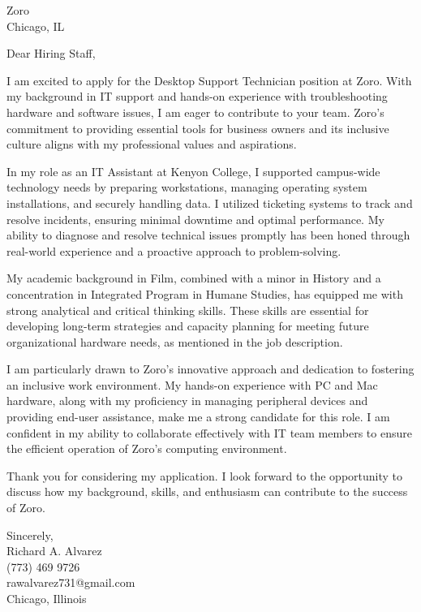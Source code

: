 \documentclass[a4paper,10pt]{letter}
\begin{document}
\begin{letter}{Zoro \\
Chicago, IL}

\opening{Dear Hiring Staff,}

I am excited to apply for the Desktop Support Technician position at Zoro. With my background in IT support and hands-on experience with troubleshooting hardware and software issues, I am eager to contribute to your team. Zoro’s commitment to providing essential tools for business owners and its inclusive culture aligns with my professional values and aspirations.

In my role as an IT Assistant at Kenyon College, I supported campus-wide technology needs by preparing workstations, managing operating system installations, and securely handling data. I utilized ticketing systems to track and resolve incidents, ensuring minimal downtime and optimal performance. My ability to diagnose and resolve technical issues promptly has been honed through real-world experience and a proactive approach to problem-solving.

My academic background in Film, combined with a minor in History and a concentration in Integrated Program in Humane Studies, has equipped me with strong analytical and critical thinking skills. These skills are essential for developing long-term strategies and capacity planning for meeting future organizational hardware needs, as mentioned in the job description.

I am particularly drawn to Zoro’s innovative approach and dedication to fostering an inclusive work environment. My hands-on experience with PC and Mac hardware, along with my proficiency in managing peripheral devices and providing end-user assistance, make me a strong candidate for this role. I am confident in my ability to collaborate effectively with IT team members to ensure the efficient operation of Zoro’s computing environment.

Thank you for considering my application. I look forward to the opportunity to discuss how my background, skills, and enthusiasm can contribute to the success of Zoro. 

\vspace{1em}

Sincerely, \\ 
Richard A. Alvarez \\
(773) 469 9726 \\
rawalvarez731@gmail.com \\
Chicago, Illinois

\end{letter}
\end{document}
